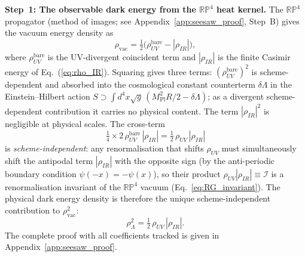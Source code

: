 \documentclass[12pt,a4paper]{article}
\begin{document}
\textbf{Step~1: The observable dark energy from the $\mathbb{RP}^4$ heat kernel.}
The $\mathbb{RP}^4$ propagator (method of images; see Appendix~\ref{app:seesaw_proof},
Step~B) gives the vacuum energy density as
\begin{equation}
  \rho_\mathrm{vac} = \tfrac{1}{2}\bigl(\rho_{UV}^\mathrm{bare} - |\rho_{IR}|\bigr),
\end{equation}
where $\rho_{UV}^\mathrm{bare}$ is the UV-divergent coincident term and $|\rho_{IR}|$
is the finite Casimir energy of Eq.~(\ref{eq:rho_IR}).
Squaring gives three terms: $(\rho_{UV}^\mathrm{bare})^2$ is scheme-dependent and
absorbed into the cosmological constant counterterm $\delta\Lambda$ in the
Einstein--Hilbert action $S \supset \int\!d^4x\sqrt{g}\,(M_\mathrm{Pl}^2 R/2 - \delta\Lambda)$;
as a divergent scheme-dependent contribution it carries no physical content.
The term $|\rho_{IR}|^2$ is negligible at physical scales. The cross-term
\begin{equation}
  \tfrac{1}{4}\times 2\,\rho_{UV}^\mathrm{bare}\,|\rho_{IR}|
  = \tfrac{1}{2}\,\rho_{UV}\,|\rho_{IR}|
\end{equation}
is \emph{scheme-independent}: any renormalisation that shifts $\rho_{UV}$ must
simultaneously shift the antipodal term $|\rho_{IR}|$ with the opposite sign
(by the anti-periodic boundary condition $\psi(-x) = -\psi(x)$), so their
product $\rho_{UV}|\rho_{IR}| \equiv \mathcal{I}$ is a renormalisation invariant
of the $\mathbb{RP}^4$ vacuum (Eq.~\ref{eq:RG_invariant}).
The physical dark energy density is therefore the unique scheme-independent
contribution to $\rho_\mathrm{vac}^2$:
\begin{equation}
  \rho_\Lambda^2 = \tfrac{1}{2}\,\rho_{UV}\,|\rho_{IR}|.
\end{equation}
The complete proof with all coefficients tracked is given in
Appendix~\ref{app:seesaw_proof}.
\end{document}
